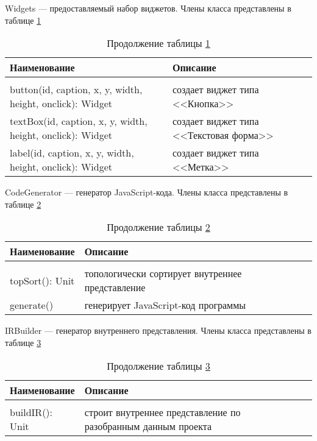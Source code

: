 Widgets --- предоставляемый набор виджетов. Члены класса представлены в таблице \ref{tab:class18}

\begin{longtable} {| p{8.3cm} | p{8.35cm}l |}
	\caption{Члены класса Widgets}
	\label{tab:class18}\\
	\hline
	\centering Наименование &  \centering Описание & \\
	\hline
	\endfirsthead
	\caption*{Продолжение таблицы \ref{tab:class18}}\\
	\hline
	\endhead
	\hline
	\endfoot
	button(id, caption, x, y, width, height, onclick): Widget & создает виджет типа <<Кнопка>> & \\
	\hline
	textBox(id, caption, x, y, width, height, onclick): Widget & создает виджет типа <<Текстовая форма>> & \\
	\hline
	label(id, caption, x, y, width, height, onclick): Widget & создает виджет типа <<Метка>> & \\
\end{longtable}

CodeGenerator --- генератор JavaScript-кода. Члены класса представлены в таблице \ref{tab:class19}

\begin{longtable} {| p{8.3cm} | p{8.35cm}l |}
	\caption{Члены класса CodeGenerator}
	\label{tab:class19}\\
	\hline
	\centering Наименование &  \centering Описание & \\
	\hline
	\endfirsthead
	\caption*{Продолжение таблицы \ref{tab:class19}}\\
	\hline
	\endhead
	\hline
	\endfoot
	topSort(): Unit & топологически сортирует внутреннее представление & \\
	\hline
	generate() & генерирует JavaScript-код программы & \\
\end{longtable}

IRBuilder --- генератор внутреннего представления. Члены класса представлены в таблице \ref{tab:class20}

\begin{longtable} {| p{8.3cm} | p{8.35cm}l |}
	\caption{Члены класса IRBuilder}
	\label{tab:class20}\\
	\hline
	\centering Наименование &  \centering Описание & \\
	\hline
	\endfirsthead
	\caption*{Продолжение таблицы \ref{tab:class20}}\\
	\hline
	\endhead
	\hline
	\endfoot
	buildIR(): Unit & строит внутреннее представление по разобранным данным проекта & \\
\end{longtable}

